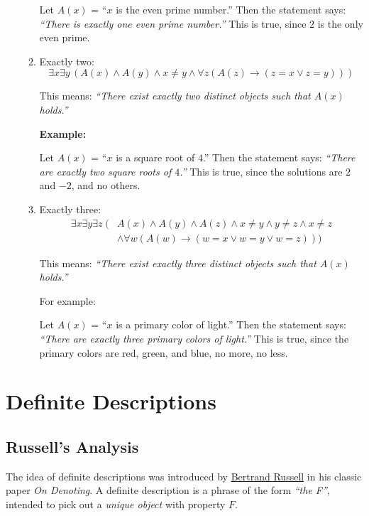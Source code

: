 \documentclass[12pt,a4paper,openany]{article}
\begin{document}
\begin{enumerate}
\begin{enumerate}
Let \(A(x)\) = ``\(x\) is the even prime number.'' Then the statement
says: \emph{``There is exactly one even prime number.''} This is true,
since \(2\) is the only even prime.

\item
Exactly two:
\[
\exists x \exists y \, (A(x) \land A(y) \land x \neq y \land \forall z (A(z) \to (z = x \lor z = y)))
\]

This means: \emph{``There exist exactly two distinct objects such that
\(A(x)\) holds.''}

\textbf{Example:}

Let \(A(x)\) = ``\(x\) is a square root of \(4\).'' Then the statement
says: \emph{``There are exactly two square roots of \(4\).''} This is
true, since the solutions are \(2\) and \(-2\), and no others.

\item
Exactly three:
\begin{align*}
\exists x \exists y \exists z \; (&A(x) \land A(y) \land A(z) \land x \neq y \land y \neq z \land x \neq z \\
&\land \forall w (A(w) \to (w = x \lor w = y \lor w = z)))
\end{align*}


This means: \emph{``There exist exactly three distinct objects such
that \(A(x)\) holds.''}

For example:

Let \(A(x)\) = ``\(x\) is a primary color of light.'' Then the
statement says: \emph{``There are exactly three primary colors of
light.''} This is true, since the primary colors are red, green, and
blue, no more, no less.
\end{enumerate}
\end{enumerate}


\newpage
\section{Definite Descriptions} 

\subsection{Russell's Analysis}
\label{russells-analysis}

The idea of definite descriptions was introduced by \href{https://en.wikipedia.org/wiki/Bertrand_Russell}{Bertrand Russell} in his classic paper \textit{On Denoting}. 
A definite description is a phrase of the form \textit{``the F''}, intended to pick out a \textit{unique object} with property $F$.
\end{document}
